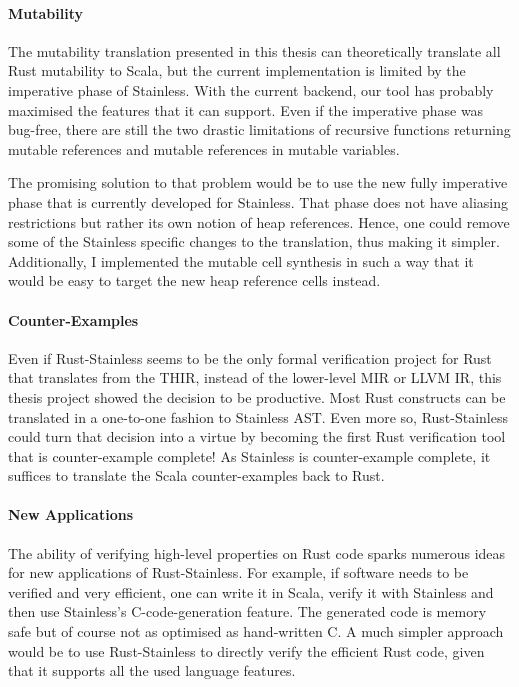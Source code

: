 \paragraph{Mutability}

The mutability translation presented in this thesis can theoretically translate
all Rust mutability to Scala, but the current implementation is limited by the
imperative phase of Stainless. With the current backend, our tool has probably
maximised the features that it can support. Even if the imperative phase was
bug-free, there are still the two drastic limitations of recursive functions
returning mutable references and mutable references in mutable variables.

The promising solution to that problem would be to use the new fully imperative
phase that is currently developed for Stainless. That phase does not have
aliasing restrictions but rather its own notion of heap references. Hence, one
could remove some of the Stainless specific changes to the translation, thus
making it simpler.  Additionally, I implemented the mutable cell synthesis in
such a way that it would be easy to target the new heap reference cells instead.


\paragraph{Counter-Examples}

Even if Rust-Stainless seems to be the only formal verification project for Rust
that translates from the THIR, instead of the lower-level MIR or LLVM IR, this
thesis project showed the decision to be productive. Most Rust constructs can be
translated in a one-to-one fashion to Stainless AST. Even more so,
Rust-Stainless could turn  that decision into a virtue by becoming the first
Rust verification tool that is counter-example complete! As Stainless is
counter-example complete, it suffices to translate the Scala counter-examples
back to Rust.



\paragraph{New Applications}

The ability of verifying high-level properties on Rust code sparks numerous
ideas for new applications of Rust-Stainless. For example, if software needs to
be verified and very efficient, one can write it in Scala, verify it with
Stainless and then use Stainless's C-code-generation feature. The generated code
is memory safe but of course not as optimised as hand-written C. A much simpler
approach would be to use Rust-Stainless  to directly verify the efficient Rust
code, given that it supports all the used language features.

